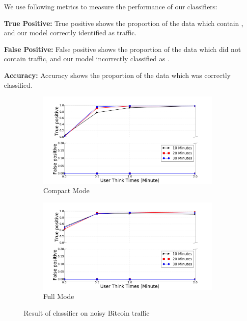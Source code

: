 We use following metrics to measure the performance of our classifiers:
\begin{compactitem}
\item \textbf{True Positive:} True positive shows the proportion of the data which contain \bc, and our model correctly identified as \bc traffic.
\item \textbf{False Positive:} False positive shows the proportion of the data which did  not contain \bc traffic, and our model incorrectly classified as \bc.
\item \textbf{Accuracy:} Accuracy shows the proportion of the data which was correctly classified.
\end{compactitem}
\begin{figure}

\begin{subfigure}{0.48\linewidth}
\centering
\includegraphics[width=\linewidth]{image/jan25/cmp_sizeHist.pdf}
\caption{Compact Mode}
\label{fig:vanilla_sizeTor}
\end{subfigure}
\begin{subfigure}{0.48\linewidth}
\centering
\includegraphics[width=\linewidth]{image/jan25/full_sizeHist.pdf}
\caption{Full Mode}
\label{fig:vanilla_d2u}
\end{subfigure}
\caption{Result of  classifier on noisy Bitcoin traffic}
\label{fig:sizeHist_non}
\end{figure} 
